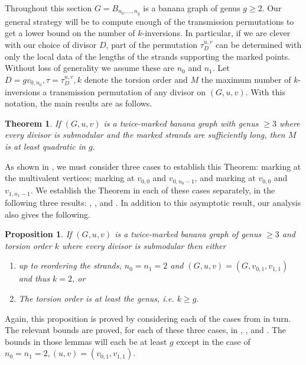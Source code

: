 \documentclass[11pt]{article}
\newtheorem{theorem}[theo]{Theorem}
\newtheorem{prop}[theo]{Proposition}
\theoremstyle{definition}
\numberwithin{equation}{section}
\newcommand{\tauD}{\tau^{u,v}_D}
\begin{document}
Throughout this section $G = B_{n_0,\dots,n_g}$ is a banana graph of genus $g\geq 2$. Our general strategy will be to compute enough of the transmission permutations to get a lower bound on the number of $k$-inversions. In particular, if we are clever with our choice of divisor $D$, part of the permutation $\tauD$ can be determined with only the local data of the lengths of the strands supporting the marked points. Without loss of generality we assume these are $n_0$ and $n_1$. Let $D = gv_{0,n_0}, \tau = \tauD, k$ denote the torsion order and $M$ the maximum number of $k$-inversions a transmission permutation of any divisor on $(G,u,v)$. With this notation, the main results are as follows.

\begin{theorem}\label{thm-quadInvGrowth}
    If $(G,u,v)$ is a twice-marked banana graph with genus $\geq 3$ where every divisor is submodular and the marked strands are sufficiently long, then $M$ is at least quadratic in $g$.
\end{theorem}

As shown in , we must consider three cases to establish this Theorem: marking at the multivalent vertices; marking at $v_{0,0}$ and $v_{0,n_0-1}$, and marking at $v_{0,0}$ and $v_{1,n_1-1}$. We establish the Theorem in each of these cases separately, in the following three results: , , and . In addition to this asymptotic result, our analysis also gives the following. 


\begin{prop}\label{prop-bananTorsion}
    If $(G,u,v)$ is a twice-marked banana graph of genus $\geq 3$ and torsion order $k$ where every divisor is submodular then either
    \begin{enumerate}[label = \arabic*)]
        \item up to reordering the strands, $n_0 = n_1 = 2$ and $(G,u,v) = (G,v_{0,1},v_{1,1})$ and thus $k = 2$, or
        \item The torsion order is at least the genus, i.e. $k \geq g$.
    \end{enumerate}
\end{prop}

Again, this proposition is proved by considering each of the cases from  in turn. The relevant bounds are proved, for each of these three cases, in , , and . The bounds in those lemmas will each be at least $g$ except in the case of $n_0 = n_1 = 2, (u,v) = (v_{0,1},v_{1,1})$.
\end{document}
